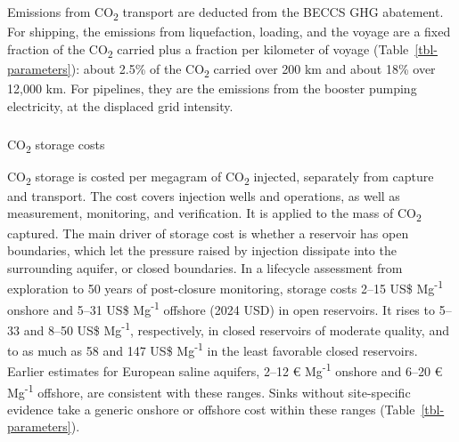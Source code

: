 \documentclass[
  letterpaper,
  twoside,
  twocolumn,
  9pt]{article}
\makeatletter
\let\oldsubparagraph\subparagraph
\renewcommand{\subparagraph}{
    \@ifstar
      \xxxSubParagraphStar
      \xxxSubParagraphNoStar
  }
\newcommand{\xxxSubParagraphStar}[1]{\oldsubparagraph*{#1}\mbox{}}
\newcommand{\xxxSubParagraphNoStar}[1]{\oldsubparagraph{#1}\mbox{}}
\makeatother
\begin{document}
Emissions from CO\textsubscript{2} transport are deducted from the BECCS
GHG abatement. For shipping, the emissions from liquefaction, loading,
and the voyage are a fixed fraction of the CO\textsubscript{2} carried
plus a fraction per kilometer of voyage (Table~\ref{tbl-parameters}):
about 2.5\% of the CO\textsubscript{2} carried over 200 km and about
18\% over 12,000 km.\citep{albaroudi2021} For pipelines, they are the
emissions from the booster pumping electricity, at the displaced grid
intensity.

\subparagraph{\texorpdfstring{CO\textsubscript{2} storage
costs}{CO2 storage costs}}\label{co2-storage-costs}

CO\textsubscript{2} storage is costed per megagram of
CO\textsubscript{2} injected, separately from capture and transport. The
cost covers injection wells and operations, as well as measurement,
monitoring, and verification. It is applied to the mass of
CO\textsubscript{2} captured. The main driver of storage cost is whether
a reservoir has open boundaries, which let the pressure raised by
injection dissipate into the surrounding aquifer, or closed
boundaries.\citep{gccsi2025} In a lifecycle assessment from exploration
to 50 years of post-closure monitoring, storage costs 2--15 US\$
Mg\textsuperscript{-1} onshore and 5--31 US\$ Mg\textsuperscript{-1}
offshore (2024 USD) in open reservoirs. It rises to 5--33 and 8--50 US\$
Mg\textsuperscript{-1}, respectively, in closed reservoirs of moderate
quality, and to as much as 58 and 147 US\$ Mg\textsuperscript{-1} in the
least favorable closed reservoirs.\citep{gccsi2025} Earlier estimates
for European saline aquifers, 2--12 € Mg\textsuperscript{-1} onshore and
6--20 € Mg\textsuperscript{-1} offshore, are consistent with these
ranges.\citep{zep2011} Sinks without site-specific evidence take a
generic onshore or offshore cost within these ranges
(Table~\ref{tbl-parameters}).
\end{document}
